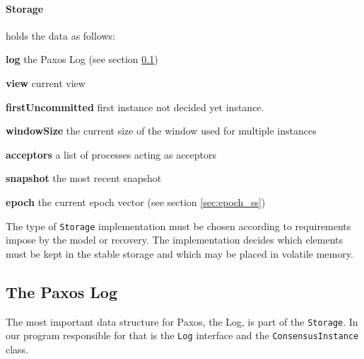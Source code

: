 \paragraph{\normalfont \ttfamily Storage}
holds the data as follows:
\begin{tightList}[\setlength{\labelwidth}{0em}]
  \item[\textbf{log}] the Paxos Log (see section \ref{subsec:the_paxos_log})
  \item[\textbf{view}] current view
  \item[\textbf{firstUncommitted}] first instance not decided yet instance.
  \item[\textbf{windowSize}] the current size of the window used for multiple instances
  \item[\textbf{acceptors}] a list of processes acting as acceptors
  \item[\textbf{snapshot}] the most recent snapshot
  \item[\textbf{epoch}] the current epoch vector (see section \ref{sec:epoch_ss})
\end{tightList}

\strut

The type of \texttt{Storage} implementation must be chosen according to requirements impose by the model or recovery.
The implementation decides which elements must be kept in the stable storage and which may be placed in volatile memory.

\subsection{The Paxos Log}
\label{subsec:the_paxos_log}
The most important data structure for Paxos, the Log, is part of the \texttt{Storage}.
In our program responsible for that is the \texttt{Log} interface and the \texttt{Con\-sen\-susInstance} class.

